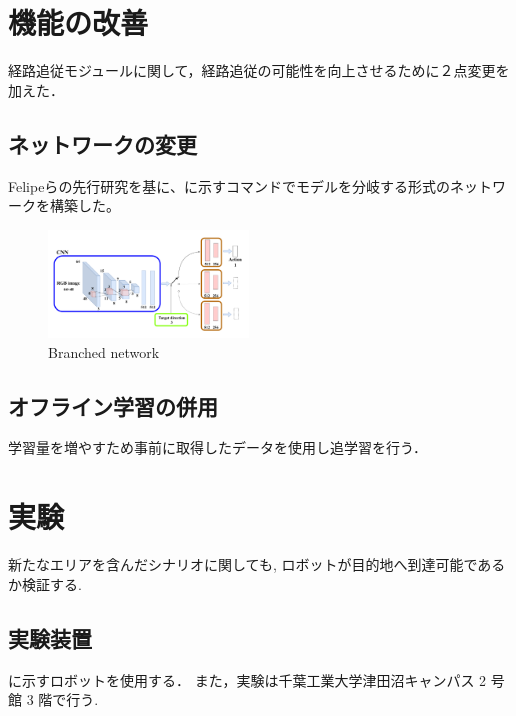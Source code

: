 \documentclass[10pt]{jarticle}
\begin{document}
    \section{機能の改善}%
    経路追従モジュールに関して，経路追従の可能性を向上させるために２点変更を加えた．
    \subsection{ネットワークの変更}
    Felipeら\cite{Codevilla2018}の先行研究を基に、に示すコマンドでモデルを分岐する形式のネットワークを構築した。
    \begin{center}
        \begin{figure}[h]
            \includegraphics[width=0.475\textwidth]{./fig/ishiguro/branched.pdf}
            \caption{Branched network}
            \label{fig:branched}
        \end{figure}
    \end{center}

    \subsection{オフライン学習の併用}
    学習量を増やすため事前に取得したデータを使用し追学習を行う．

    \section{実験}%
    新たなエリアを含んだシナリオに関しても, ロボットが目的地へ到達可能であるか検証する.
    \subsection{実験装置}
    に示すロボットを使用する．
    また，実験は千葉工業大学津田沼キャンパス 2 号館 3 階で行う.
    
\end{document}

